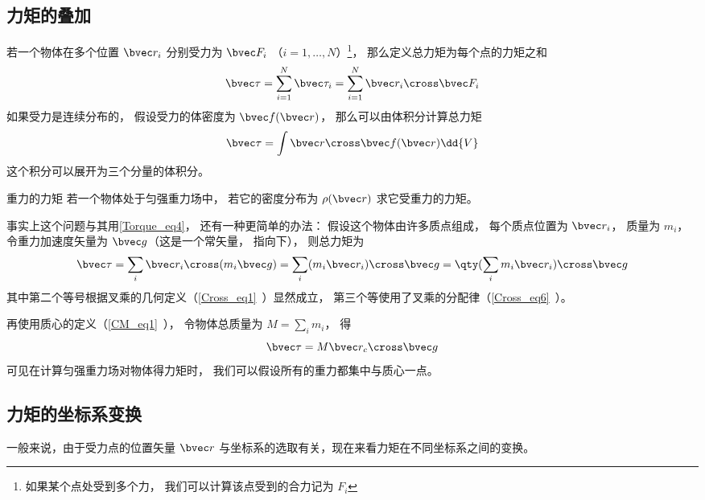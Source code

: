 \subsection{力矩的叠加}

若一个物体在多个位置 $\bvec r_i$ 分别受力为 $\bvec F_i$ （$i = 1, \dots, N$）\footnote{如果某个点处受到多个力， 我们可以计算该点受到的合力记为 $F_i$}， 那么定义总力矩为每个点的力矩之和
\begin{equation}
\bvec \tau = \sum_{i=1}^N \bvec \tau_i = \sum_{i=1}^N \bvec r_i \cross \bvec F_i
\end{equation}
如果受力是连续分布的， 假设受力的体密度为 $\bvec f(\bvec r)$， 那么可以由体积分计算总力矩
\begin{equation}\label{Torque_eq4}
\bvec \tau = \int \bvec r \cross \bvec f(\bvec r) \dd{V}
\end{equation}
这个积分可以展开为三个分量的体积分。

\begin{example}{重力的力矩}\label{Torque_ex1}
若一个物体处于匀强重力场中， 若它的密度分布为 $\rho(\bvec r)$ 求它受重力的力矩。

事实上这个问题与其用\autoref{Torque_eq4}， 还有一种更简单的办法： 假设这个物体由许多质点组成， 每个质点位置为 $\bvec r_i$， 质量为 $m_i$， 令重力加速度矢量为 $\bvec g$（这是一个常矢量， 指向下）， 则总力矩为
\begin{equation}
\bvec \tau = \sum_i \bvec r_i \cross (m_i \bvec g) = \sum_i (m_i \bvec r_i) \cross \bvec g = \qty(\sum_i m_i \bvec r_i) \cross \bvec g
\end{equation}
其中第二个等号根据叉乘的几何定义（\autoref{Cross_eq1}~）显然成立， 第三个等使用了叉乘的分配律（\autoref{Cross_eq6}~）。


再使用质心的定义（\autoref{CM_eq1}~）， 令物体总质量为 $M = \sum_i m_i$， 得
\begin{equation}
\bvec \tau = M \bvec r_c \cross \bvec g
\end{equation}
可见在计算匀强重力场对物体得力矩时， 我们可以假设所有的重力都集中与质心一点。
\end{example}

\subsection{力矩的坐标系变换}\label{Torque_sub1}
一般来说，由于受力点的位置矢量 $\bvec r$ 与坐标系的选取有关，现在来看力矩在不同坐标系之间的变换。

